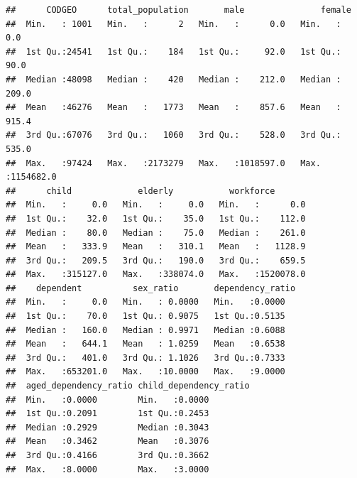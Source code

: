 \documentclass[]{article}
\newenvironment{Shaded}{\begin{snugshade}}{\end{snugshade}}
\newcommand{\KeywordTok}[1]{\textcolor[rgb]{0.13,0.29,0.53}{\textbf{#1}}}
\newcommand{\DataTypeTok}[1]{\textcolor[rgb]{0.13,0.29,0.53}{#1}}
\newcommand{\DecValTok}[1]{\textcolor[rgb]{0.00,0.00,0.81}{#1}}
\newcommand{\StringTok}[1]{\textcolor[rgb]{0.31,0.60,0.02}{#1}}
\newcommand{\CommentTok}[1]{\textcolor[rgb]{0.56,0.35,0.01}{\textit{#1}}}
\newcommand{\OperatorTok}[1]{\textcolor[rgb]{0.81,0.36,0.00}{\textbf{#1}}}
\newcommand{\NormalTok}[1]{#1}
\begin{document}
\begin{verbatim}
##      CODGEO      total_population       male               female         
##  Min.   : 1001   Min.   :      2   Min.   :      0.0   Min.   :      0.0  
##  1st Qu.:24541   1st Qu.:    184   1st Qu.:     92.0   1st Qu.:     90.0  
##  Median :48098   Median :    420   Median :    212.0   Median :    209.0  
##  Mean   :46276   Mean   :   1773   Mean   :    857.6   Mean   :    915.4  
##  3rd Qu.:67076   3rd Qu.:   1060   3rd Qu.:    528.0   3rd Qu.:    535.0  
##  Max.   :97424   Max.   :2173279   Max.   :1018597.0   Max.   :1154682.0  
##      child             elderly           workforce        
##  Min.   :     0.0   Min.   :     0.0   Min.   :      0.0  
##  1st Qu.:    32.0   1st Qu.:    35.0   1st Qu.:    112.0  
##  Median :    80.0   Median :    75.0   Median :    261.0  
##  Mean   :   333.9   Mean   :   310.1   Mean   :   1128.9  
##  3rd Qu.:   209.5   3rd Qu.:   190.0   3rd Qu.:    659.5  
##  Max.   :315127.0   Max.   :338074.0   Max.   :1520078.0  
##    dependent          sex_ratio       dependency_ratio
##  Min.   :     0.0   Min.   : 0.0000   Min.   :0.0000  
##  1st Qu.:    70.0   1st Qu.: 0.9075   1st Qu.:0.5135  
##  Median :   160.0   Median : 0.9971   Median :0.6088  
##  Mean   :   644.1   Mean   : 1.0259   Mean   :0.6538  
##  3rd Qu.:   401.0   3rd Qu.: 1.1026   3rd Qu.:0.7333  
##  Max.   :653201.0   Max.   :10.0000   Max.   :9.0000  
##  aged_dependency_ratio child_dependency_ratio
##  Min.   :0.0000        Min.   :0.0000        
##  1st Qu.:0.2091        1st Qu.:0.2453        
##  Median :0.2929        Median :0.3043        
##  Mean   :0.3462        Mean   :0.3076        
##  3rd Qu.:0.4166        3rd Qu.:0.3662        
##  Max.   :8.0000        Max.   :3.0000
\end{verbatim}

\begin{Shaded}
\end{Shaded}
\end{document}
